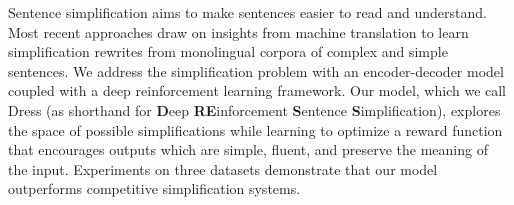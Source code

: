 Sentence simplification aims to make sentences easier to read and understand. Most recent approaches draw on insights from machine translation to learn simplification rewrites from monolingual corpora of complex and simple sentences. We address the simplification problem with an encoder-decoder model coupled with a deep reinforcement learning framework. Our model, which we call {\sc Dress} (as shorthand for {\bf D}eep {\bf RE}inforcement {\bf S}entence {\bf S}implification), explores the space of possible simplifications while learning to optimize a reward function that encourages outputs which are simple, fluent, and preserve the meaning of the input. Experiments on three datasets demonstrate that our model outperforms competitive simplification systems.
